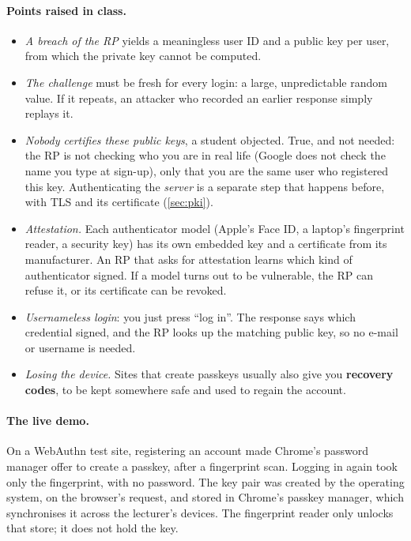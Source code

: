 \paragraph{Points raised in class.}
\begin{itemize}
    \item \emph{A breach of the RP} yields a meaningless user ID and a public key per user, from which the private key cannot be computed.
    \item \emph{The challenge} must be fresh for every login: a large, unpredictable random value. If it repeats, an attacker who recorded an earlier response simply replays it.
    \item \emph{Nobody certifies these public keys}, a student objected. True, and not needed: the RP is not checking who you are in real life (Google does not check the name you type at sign-up), only that you are the same user who registered this key. Authenticating the \emph{server} is a separate step that happens before, with TLS and its certificate (\cref{sec:pki}).
    \item \emph{Attestation.} Each authenticator model (Apple's Face ID, a laptop's fingerprint reader, a security key) has its own embedded key and a certificate from its manufacturer. An RP that asks for attestation learns which kind of authenticator signed. If a model turns out to be vulnerable, the RP can refuse it, or its certificate can be revoked.
    \item \emph{Usernameless login}: you just press \enquote{log in}. The response says which credential signed, and the RP looks up the matching public key, so no e-mail or username is needed.
    \item \emph{Losing the device.} Sites that create passkeys usually also give you \textbf{recovery codes}, to be kept somewhere safe and used to regain the account.
\end{itemize}

\paragraph{The live demo.} On a WebAuthn test site, registering an account made Chrome's password manager offer to create a passkey, after a fingerprint scan. Logging in again took only the fingerprint, with no password. The key pair was created by the operating system, on the browser's request, and stored in Chrome's passkey manager, which synchronises it across the lecturer's devices. The fingerprint reader only unlocks that store; it does not hold the key.

